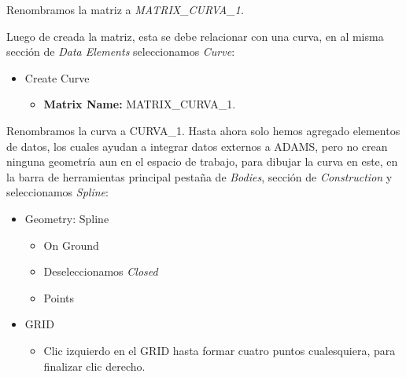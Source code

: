         Renombramos la matriz a \textit{MATRIX\_CURVA\_1. }
        
        Luego de creada la matriz, esta se debe relacionar con una curva, en al misma sección de \textit{Data Elements} seleccionamos \textit{Curve}:
        
        \begin{scope}
            \renewcommand{\labelitemi}{\blacklozenge}
            \renewcommand{\labelitemii}{\checkmark}
            \begin{itemize}
                \item Create Curve
                \begin{itemize}
                    \item \textbf{Matrix Name:} MATRIX\_CURVA\_1. 
                \end{itemize}
            \end{itemize}
        \end{scope}
        
        Renombramos la curva a CURVA\_1. Hasta ahora solo hemos agregado elementos de datos, los cuales ayudan a integrar datos externos a ADAMS, pero no crean ninguna geometría aun en el espacio de trabajo, para dibujar la curva en este, en la barra de herramientas principal pestaña de \textit{Bodies}, sección de \textit{Construction} y seleccionamos \textit{Spline}:
        
        \begin{scope}
            \renewcommand{\labelitemi}{\blacklozenge}
            \renewcommand{\labelitemii}{\checkmark}
            \begin{itemize}
                \item Geometry: Spline
                \begin{itemize}
                    \item On Ground
                    \item Deseleccionamos \textit{Closed}
                    \item Points
                \end{itemize}
                \item GRID
                \begin{itemize}
                    \item Clic izquierdo en el GRID hasta formar cuatro puntos cualesquiera, para finalizar clic derecho.
                \end{itemize}
            \end{itemize}
        \end{scope}
        
